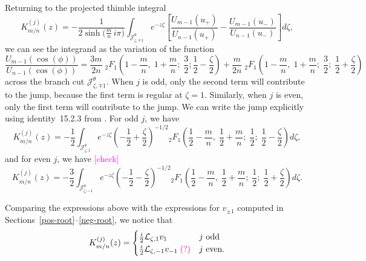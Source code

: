 \documentclass{article}
\newcommand{\laplace}{\mathcal{L}}
\theoremstyle{definition}
\theoremstyle{plain}
\begin{document}
Returning to the projected thimble integral
\[ K^{(j)}_{m/n}(z) = -\frac{1}{2\sinh\big(\tfrac{m}{n}\,i\pi\big)} \int_{\mathcal{J}^\theta_{\zeta, \mp 1}} e^{-z\zeta} \left[ \frac{U_{m-1}(u_+)}{U_{n-1}(u_+)} - \frac{U_{m-1}(u_-)}{U_{n-1}(u_-)} \right] d\zeta, \]
we can see the integrand as the variation of the function
\[ \frac{U_{m-1}(\cos(\phi))}{U_{n-1}(\cos(\phi))} = \frac{3m}{2n}\;{}_2F_1\left(1 - \frac{m}{n},\;1 + \frac{m}{n};\;\frac{3}{2};\frac{1}{2} - \frac{\zeta}{2}\right) + \frac{m}{2n}\;{}_2F_1\left(1 - \frac{m}{n},\;1 + \frac{m}{n};\;\frac{3}{2};\;\frac{1}{2} + \frac{\zeta}{2}\right) \]
across the branch cut $\mathcal{J}^\theta_{\zeta, \mp 1}$. When $j$ is odd, only the second term will contribute to the jump, because the first term is regular at $\zeta = 1$. Similarly, when $j$ is even, only the first term will contribute to the jump. We can write the jump explicitly using identity~15.2.3 from \cite{dlmf}. For odd $j$, we have
\[ K^{(j)}_{m/n}(z) = -\frac{1}{2} \int_{\mathcal{J}^\theta_{\zeta, 1}} e^{-z\zeta} \left(-\frac{1}{2}+\frac{\zeta}{2}\right)^{-1/2} {}_2F_1\left(\frac{1}{2} - \frac{m}{n},\;\frac{1}{2} + \frac{m}{n};\;\frac{1}{2};\;\frac{1}{2} - \frac{\zeta}{2}\right) d\zeta, \]
and for even $j$, we have \textcolor{magenta}{[check]}
\[ K^{(j)}_{m/n}(z) = -\frac{3}{2} \int_{\mathcal{J}^\theta_{\zeta, -1}} e^{-z\zeta} \left(-\frac{1}{2}-\frac{\zeta}{2}\right)^{-1/2} {}_2F_1\left(\frac{1}{2} - \frac{m}{n},\;\frac{1}{2} + \frac{m}{n};\;\frac{1}{2};\;\frac{1}{2} + \frac{\zeta}{2}\right) d\zeta. \]

Comparing the expressions above with the expressions for $v_{\pm 1}$ computed in Sections~\ref{pos-root}--\ref{neg-root}, we notice that
\[ K^{(j)}_{m/n}(z) = \begin{cases}
\frac{i}{2}\laplace_{\zeta, 1} v_1 & j \text{ odd} \\
\frac{i}{2}\laplace_{\zeta, -1} v_{-1} \;\textcolor{magenta}{\text{(?)}} & j \text{ even}.
\end{cases} \]
\color{black}
%
\end{document}

